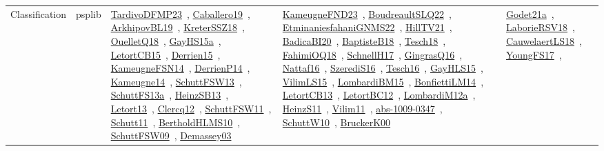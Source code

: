 {\begin{longtable}{lp{3cm}>{\raggedright\arraybackslash}p{6cm}>{\raggedright\arraybackslash}p{6cm}>{\raggedright\arraybackslash}p{8cm}}
Classification & psplib & \href{../works/TardivoDFMP23.pdf}{TardivoDFMP23}~\cite{TardivoDFMP23}, \href{../works/Caballero19.pdf}{Caballero19}~\cite{Caballero19}, \href{../works/ArkhipovBL19.pdf}{ArkhipovBL19}~\cite{ArkhipovBL19}, \href{../works/KreterSSZ18.pdf}{KreterSSZ18}~\cite{KreterSSZ18}, \href{../works/OuelletQ18.pdf}{OuelletQ18}~\cite{OuelletQ18}, \href{../works/GayHS15a.pdf}{GayHS15a}~\cite{GayHS15a}, \href{../works/LetortCB15.pdf}{LetortCB15}~\cite{LetortCB15}, \href{../works/Derrien15.pdf}{Derrien15}~\cite{Derrien15}, \href{../works/KameugneFSN14.pdf}{KameugneFSN14}~\cite{KameugneFSN14}, \href{../works/DerrienP14.pdf}{DerrienP14}~\cite{DerrienP14}, \href{../works/Kameugne14.pdf}{Kameugne14}~\cite{Kameugne14}, \href{../works/SchuttFSW13.pdf}{SchuttFSW13}~\cite{SchuttFSW13}, \href{../works/SchuttFS13a.pdf}{SchuttFS13a}~\cite{SchuttFS13a}, \href{../works/HeinzSB13.pdf}{HeinzSB13}~\cite{HeinzSB13}, \href{../works/Letort13.pdf}{Letort13}~\cite{Letort13}, \href{../works/Clercq12.pdf}{Clercq12}~\cite{Clercq12}, \href{../works/SchuttFSW11.pdf}{SchuttFSW11}~\cite{SchuttFSW11}, \href{../works/Schutt11.pdf}{Schutt11}~\cite{Schutt11}, \href{../works/BertholdHLMS10.pdf}{BertholdHLMS10}~\cite{BertholdHLMS10}, \href{../works/SchuttFSW09.pdf}{SchuttFSW09}~\cite{SchuttFSW09}, \href{../works/Demassey03.pdf}{Demassey03}~\cite{Demassey03} & \href{../works/KameugneFND23.pdf}{KameugneFND23}~\cite{KameugneFND23}, \href{../works/BoudreaultSLQ22.pdf}{BoudreaultSLQ22}~\cite{BoudreaultSLQ22}, \href{../works/EtminaniesfahaniGNMS22.pdf}{EtminaniesfahaniGNMS22}~\cite{EtminaniesfahaniGNMS22}, \href{../works/HillTV21.pdf}{HillTV21}~\cite{HillTV21}, \href{../works/BadicaBI20.pdf}{BadicaBI20}~\cite{BadicaBI20}, \href{../works/BaptisteB18.pdf}{BaptisteB18}~\cite{BaptisteB18}, \href{../works/Tesch18.pdf}{Tesch18}~\cite{Tesch18}, \href{../works/FahimiOQ18.pdf}{FahimiOQ18}~\cite{FahimiOQ18}, \href{../works/SchnellH17.pdf}{SchnellH17}~\cite{SchnellH17}, \href{../works/GingrasQ16.pdf}{GingrasQ16}~\cite{GingrasQ16}, \href{../works/Nattaf16.pdf}{Nattaf16}~\cite{Nattaf16}, \href{../works/SzerediS16.pdf}{SzerediS16}~\cite{SzerediS16}, \href{../works/Tesch16.pdf}{Tesch16}~\cite{Tesch16}, \href{../works/GayHLS15.pdf}{GayHLS15}~\cite{GayHLS15}, \href{../works/VilimLS15.pdf}{VilimLS15}~\cite{VilimLS15}, \href{../works/LombardiBM15.pdf}{LombardiBM15}~\cite{LombardiBM15}, \href{../works/BonfiettiLM14.pdf}{BonfiettiLM14}~\cite{BonfiettiLM14}, \href{../works/LetortCB13.pdf}{LetortCB13}~\cite{LetortCB13}, \href{../works/LetortBC12.pdf}{LetortBC12}~\cite{LetortBC12}, \href{../works/LombardiM12a.pdf}{LombardiM12a}~\cite{LombardiM12a}, \href{../works/HeinzS11.pdf}{HeinzS11}~\cite{HeinzS11}, \href{../works/Vilim11.pdf}{Vilim11}~\cite{Vilim11}, \href{../works/abs-1009-0347.pdf}{abs-1009-0347}~\cite{abs-1009-0347}, \href{../works/SchuttW10.pdf}{SchuttW10}~\cite{SchuttW10}, \href{../works/BruckerK00.pdf}{BruckerK00}~\cite{BruckerK00} & \href{../works/Godet21a.pdf}{Godet21a}~\cite{Godet21a}, \href{../works/LaborieRSV18.pdf}{LaborieRSV18}~\cite{LaborieRSV18}, \href{../works/CauwelaertLS18.pdf}{CauwelaertLS18}~\cite{CauwelaertLS18}, \href{../works/YoungFS17.pdf}{YoungFS17}~\cite{YoungFS17}, 
\end{longtable}}
